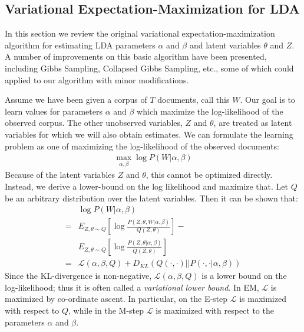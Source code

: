 \documentclass[letterpaper]{article}
\begin{document}
\subsection{Variational Expectation-Maximization for LDA}
In this section we review the original variational expectation-maximization algorithm for estimating LDA parameters $\alpha$ and $\beta$ and latent variables $\theta$ and $Z$. A number of improvements on this basic algorithm have been presented, including Gibbs Sampling, Collapsed Gibbs Sampling, etc., some of which could applied to our algorithm with minor modifications.

Assume we have been given a corpus of $T$ documents, call this $W$. Our goal is to learn values for parameters $\alpha$ and $\beta$ which maximize the log-likelihood of the observed corpus. The other unobserved variables, $Z$ and $\theta$, are treated as latent variables for which we will also obtain estimates. We can formulate the learning problem as one of maximizing the log-likelihood of the observed documents:
\begin{align}
    \max_{\alpha, \beta} \log P(W | \alpha, \beta)
\end{align}
Because of the latent variables $Z$ and $\theta$, this cannot be optimized directly. Instead, we derive a lower-bound on the log likelihood and maximize that. Let $Q$ be an arbitrary distribution over the latent variables. Then it can be shown that:
\begin{align}
    &\log P(W | \alpha, \beta)\\
    = &E_{Z, \theta \sim Q}\left[\log \frac{P(Z, \theta, W | \alpha, \beta)}{Q(Z, \theta)}\right] - \\
    &E_{Z, \theta \sim Q}\left[\log \frac{P(Z, \theta | \alpha, \beta)}{Q(Z, \theta)}\right]\\
    = &\mathcal{L}(\alpha, \beta, Q) + D_{KL}(Q(\cdot, \cdot) || P(\cdot, \cdot | \alpha, \beta))
\end{align}
Since the KL-divergence is non-negative, $\mathcal{L}(\alpha, \beta, Q)$ is a lower bound on the log-likelihood; thus it is often called a \textit{variational lower bound}. In EM, $\mathcal{L}$ is maximized by co-ordinate ascent. In particular, on the E-step $\mathcal{L}$ is maximized with respect to $Q$, while in the M-step $\mathcal{L}$ is maximized with respect to the parameters $\alpha$ and $\beta$.
\end{document}
